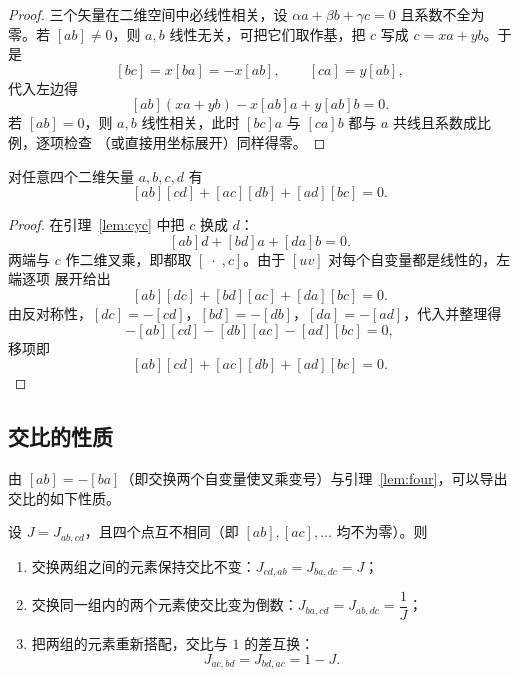 \begin{proof}
三个矢量在二维空间中必线性相关，设 $\alpha a+\beta b+\gamma c=0$ 且系数不全为零。若
$[ab]\ne0$，则 $a,b$ 线性无关，可把它们取作基，把 $c$ 写成 $c=xa+yb$。于是
\[
[bc]=x[ba]=-x[ab],\qquad [ca]=y[ab],
\]
代入左边得
\[
[ab](xa+yb)-x[ab]a+y[ab]b=0 .
\]
若 $[ab]=0$，则 $a,b$ 线性相关，此时 $[bc]a$ 与 $[ca]b$ 都与 $a$ 共线且系数成比例，逐项检查
（或直接用坐标展开）同样得零。
\end{proof}

\begin{lemma}\label{lem:four}
对任意四个二维矢量 $a,b,c,d$ 有
\[
[ab][cd]+[ac][db]+[ad][bc]=0 .
\]
\end{lemma}

\begin{proof}
在引理~\ref{lem:cyc} 中把 $c$ 换成 $d$：
\[
[ab]d+[bd]a+[da]b=0 .
\]
两端与 $c$ 作二维叉乘，即都取 $[\;\cdot\;,c]$。由于 $[uv]$ 对每个自变量都是线性的，左端逐项
展开给出
\[
[ab][dc]+[bd][ac]+[da][bc]=0 .
\]
由反对称性，$[dc]=-[cd]$，$[bd]=-[db]$，$[da]=-[ad]$，代入并整理得
\[
-[ab][cd]-[db][ac]-[ad][bc]=0,
\]
移项即
\[
[ab][cd]+[ac][db]+[ad][bc]=0 .
\]
\end{proof}

\subsection{交比的性质}

由 $[ab]=-[ba]$（即交换两个自变量使叉乘变号）与引理~\ref{lem:four}，可以导出交比的如下性质。

\begin{proposition}[交比在置换下的变化]\label{prop:J-perm}
设 $J=J_{ab,cd}$，且四个点互不相同（即 $[ab],[ac],\dots$ 均不为零）。则
\begin{enumerate}
\item 交换两组之间的元素保持交比不变：$J_{cd,ab}=J_{ba,dc}=J$；
\item 交换同一组内的两个元素使交比变为倒数：$J_{ba,cd}=J_{ab,dc}=\dfrac1J$；
\item 把两组的元素重新搭配，交比与 $1$ 的差互换：
\[
J_{ac,bd}=J_{bd,ac}=1-J .
\]
\end{enumerate}
\end{proposition}

